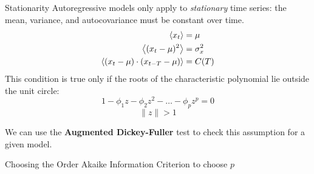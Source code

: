\begin{frame}{Stationarity}
    Autoregressive models only apply to \emph{stationary} time series:
    the mean, variance, and autocovariance must be constant over time.
        \begin{align*}
            \left< x_t \right> &= \mu \\
            \left< (x_t - \mu)^2 \right> &= \sigma_x^2 \\
            \left< (x_t - \mu) \cdot (x_{t-T} - \mu) \right> &= C(T)
        \end{align*}             
    This condition is true only if the roots of the characteristic 
    polynomial lie outside the unit circle:        
    \[ 1 - \phi_1 z - \phi_2 z^2 - \ldots - \phi_p z^p = 0 \]
    \[ \| z \| > 1 \]
    
    We can use the \textbf{Augmented Dickey-Fuller} test to check this 
    assumption for a given model.
\end{frame}

\begin{frame}{Choosing the Order}
    Akaike Information Criterion to choose $p$   
\end{frame}